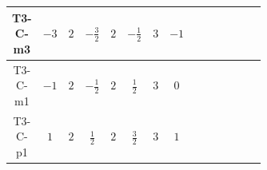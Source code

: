 \documentclass[8pt]{article}
\begin{document}
\begin{landscape}
\begin{longtable}{@{}cccccccc >{\raggedright\arraybackslash}p{0.21\linewidth} >{\raggedright\arraybackslash}p{0.21\linewidth} >{\raggedright\arraybackslash}p{0.21\linewidth}@{}}
T3-C-m3 & $-3$ & $2$ & $-\frac{3}{2}$ & $2$ & $-\frac{1}{2}$ & $3$ & $-1$ & \scriptsize\adjustbox{max width=\linewidth}{$\begin{gathered} +D_{\mu _1}\left(S_{2,j_1}\right){}^{\dagger } D_{\mu _1}\left(S_{2,j_1}\right)\end{gathered}$} & \scriptsize\adjustbox{max width=\linewidth}{$\begin{gathered} -\overline{F_{j_1,r_1}}\, F_{j_1,r_1} M_F\end{gathered}$} & \scriptsize\adjustbox{max width=\linewidth}{$\begin{gathered} +i \overline{F_{j_1,r_1}}\, \gamma ^{\mu _1}\, D_{\mu _1}\left(F_{j_1,r_1}\right)\end{gathered}$} \\
\midrule
T3-C-m1 & $-1$ & $2$ & $-\frac{1}{2}$ & $2$ & $\frac{1}{2}$ & $3$ & $0$ & \scriptsize\adjustbox{max width=\linewidth}{$\begin{gathered} +D_{\mu _1}\left(S_{2,j_1}\right){}^{\dagger } D_{\mu _1}\left(S_{2,j_1}\right)\end{gathered}$} & \scriptsize\adjustbox{max width=\linewidth}{$\begin{gathered} -\frac{1}{2} F_{j_1,r_1}{}^T\, C\, F_{j_1,r_1} M_F\end{gathered}$} & \scriptsize\adjustbox{max width=\linewidth}{$\begin{gathered} +\frac{1}{2} i F_{j_1,r_1}{}^T\, C\, \gamma ^{\mu _1}\, D_{\mu _1}\left(F_{j_1,r_1}\right)\end{gathered}$} \\
\midrule
T3-C-p1 & $1$ & $2$ & $\frac{1}{2}$ & $2$ & $\frac{3}{2}$ & $3$ & $1$ & \scriptsize\adjustbox{max width=\linewidth}{$\begin{gathered} +D_{\mu _1}\left(S_{2,j_1}\right){}^{\dagger } D_{\mu _1}\left(S_{2,j_1}\right)\end{gathered}$} & \scriptsize\adjustbox{max width=\linewidth}{$\begin{gathered} -\overline{F_{j_1,r_1}}\, F_{j_1,r_1} M_F\end{gathered}$} & \scriptsize\adjustbox{max width=\linewidth}{$\begin{gathered} +i \overline{F_{j_1,r_1}}\, \gamma ^{\mu _1}\, D_{\mu _1}\left(F_{j_1,r_1}\right)\end{gathered}$} \\
\midrule

\end{longtable}
\end{landscape}
\end{document}
